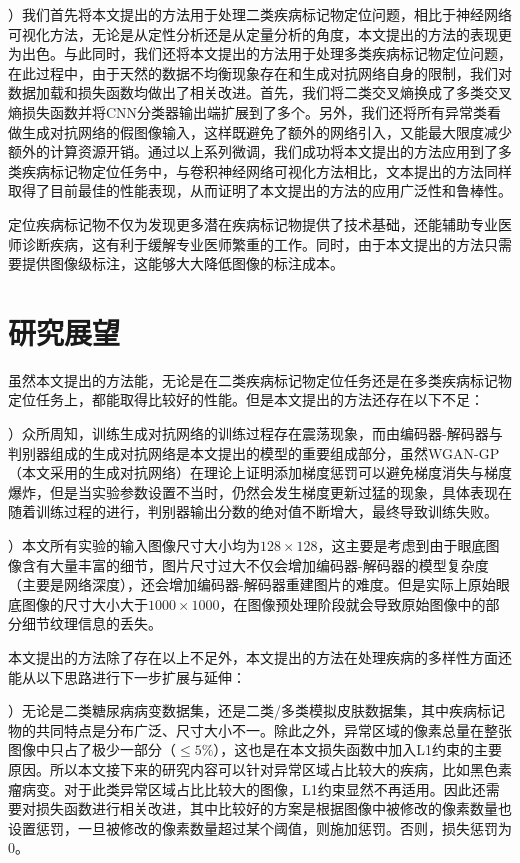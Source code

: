 ）我们首先将本文提出的方法用于处理二类疾病标记物定位问题，相比于神经网络可视化方法，无论是从定性分析还是从定量分析的角度，本文提出的方法的表现更为出色。与此同时，我们还将本文提出的方法用于处理多类疾病标记物定位问题，在此过程中，由于天然的数据不均衡现象存在和生成对抗网络自身的限制，我们对数据加载和损失函数均做出了相关改进。首先，我们将二类交叉熵换成了多类交叉熵损失函数并将CNN分类器输出端扩展到了多个。另外，我们还将所有异常类看做生成对抗网络的假图像输入，这样既避免了额外的网络引入，又能最大限度减少额外的计算资源开销。通过以上系列微调，我们成功将本文提出的方法应用到了多类疾病标记物定位任务中，与卷积神经网络可视化方法相比，文本提出的方法同样取得了目前最佳的性能表现，从而证明了本文提出的方法的应用广泛性和鲁棒性。

定位疾病标记物不仅为发现更多潜在疾病标记物提供了技术基础，还能辅助专业医师诊断疾病，这有利于缓解专业医师繁重的工作。同时，由于本文提出的方法只需要提供图像级标注，这能够大大降低图像的标注成本。

\section{研究展望}

虽然本文提出的方法能，无论是在二类疾病标记物定位任务还是在多类疾病标记物定位任务上，都能取得比较好的性能。但是本文提出的方法还存在以下不足：

）众所周知，训练生成对抗网络的训练过程存在震荡现象，而由编码器-解码器与判别器组成的生成对抗网络是本文提出的模型的重要组成部分，虽然WGAN-GP（本文采用的生成对抗网络）在理论上证明添加梯度惩罚可以避免梯度消失与梯度爆炸，但是当实验参数设置不当时，仍然会发生梯度更新过猛的现象，具体表现在随着训练过程的进行，判别器输出分数的绝对值不断增大，最终导致训练失败。

）本文所有实验的输入图像尺寸大小均为$128\times 128$，这主要是考虑到由于眼底图像含有大量丰富的细节，图片尺寸过大不仅会增加编码器-解码器的模型复杂度（主要是网络深度），还会增加编码器-解码器重建图片的难度。但是实际上原始眼底图像的尺寸大小大于$1000\times 1000$，在图像预处理阶段就会导致原始图像中的部分细节纹理信息的丢失。

本文提出的方法除了存在以上不足外，本文提出的方法在处理疾病的多样性方面还能从以下思路进行下一步扩展与延伸：

）无论是二类糖尿病病变数据集，还是二类/多类模拟皮肤数据集，其中疾病标记物的共同特点是分布广泛、尺寸大小不一。除此之外，异常区域的像素总量在整张图像中只占了极少一部分（$\le 5\%$），这也是在本文损失函数中加入L1约束的主要原因。所以本文接下来的研究内容可以针对异常区域占比较大的疾病，比如黑色素瘤病变。对于此类异常区域占比比较大的图像，L1约束显然不再适用。因此还需要对损失函数进行相关改进，其中比较好的方案是根据图像中被修改的像素数量也设置惩罚，一旦被修改的像素数量超过某个阈值，则施加惩罚。否则，损失惩罚为$0$。


